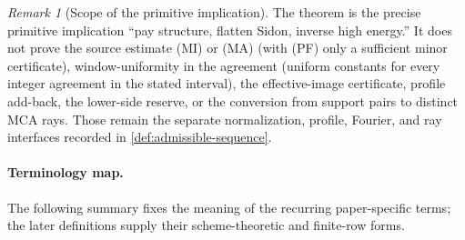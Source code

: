 \documentclass[12pt,a4paper]{amsart}
\numberwithin{equation}{section}
\theoremstyle{remark}
\newtheorem{remark}[remark]{Remark}
\begin{document}
\begin{remark}[Scope of the primitive implication]
\label{rem:intro-sidon-heavy-scope}
The theorem is the precise primitive implication ``pay structure, flatten
Sidon, inverse high energy.''  It does not prove the source estimate
\textup{(MI)} or \textup{(MA)} (with \textup{(PF)} only a sufficient
minor certificate), window-uniformity in the agreement
(uniform constants for every integer agreement in the stated interval), the
effective-image certificate, profile add-back, the lower-side reserve, or
the conversion from support pairs to distinct MCA rays.  Those remain the
separate normalization, profile, Fourier, and ray interfaces recorded in
\cref{def:admissible-sequence}.
\end{remark}

\paragraph{Terminology map.}
The following summary fixes the meaning of the recurring paper-specific
terms; the later definitions supply their scheme-theoretic and finite-row
forms.
\end{document}
